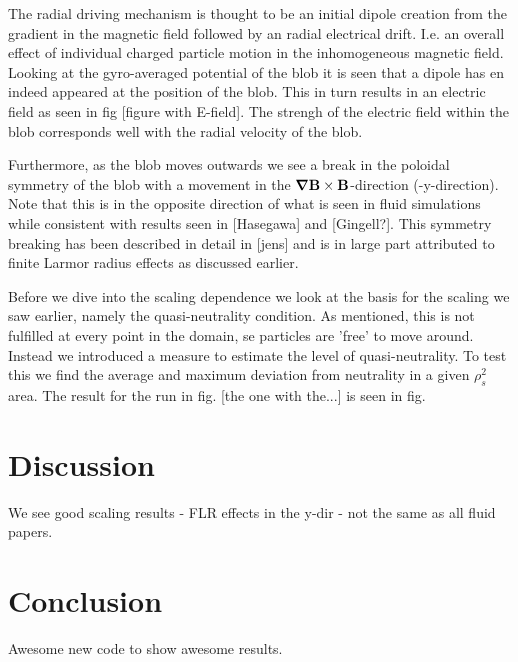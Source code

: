 \documentclass[9pt,twocolumn]{article}
\newcommand{\gv}[1]{\ensuremath{\mbox{\boldmath$ #1 $}}}
\newcommand{\fd}[1]{\mathbf{#1}}
\newcommand{\grad}[1]{\gv{\nabla} #1} %
\renewcommand{\=}[1]{\stackrel{#1}{=}} %
\theoremstyle{definition}
\theoremstyle{remark}
\begin{document}
The radial driving mechanism is thought to be an initial dipole creation from the gradient in the magnetic field followed by an radial electrical drift. I.e. an overall effect of individual charged particle motion in the inhomogeneous magnetic field. Looking at the gyro-averaged potential of the blob it is seen that a dipole has en indeed appeared at the position of the blob. This in turn results in an electric field as seen in fig [figure with E-field]. The strengh of the electric field within the blob corresponds well with the radial velocity of the blob. 

Furthermore, as the blob moves outwards we see a break in the poloidal symmetry of the blob with a movement in the $\grad \fd B\times \fd B$-direction (-y-direction). Note that this is in the opposite direction of what is seen in fluid simulations while consistent with results seen in [Hasegawa] and [Gingell?]. This symmetry breaking has been described in detail in [jens] and is in large part attributed to finite Larmor radius effects as discussed earlier. 

Before we dive into the scaling dependence we look at the basis for the scaling we saw earlier, namely the quasi-neutrality condition. As mentioned, this is not fulfilled at every point in the domain, se particles are 'free' to move around. Instead we introduced a measure to estimate the level of quasi-neutrality. To test this we find the average and maximum deviation from neutrality in a given $\rho_s^2$ area. The result for the run in fig. [the one with the...] is seen in fig.  






\section{Discussion}
We see good scaling results - FLR effects in the y-dir - not the same as all fluid papers.

\section{Conclusion}
Awesome new code to show awesome results.


\end{document}
